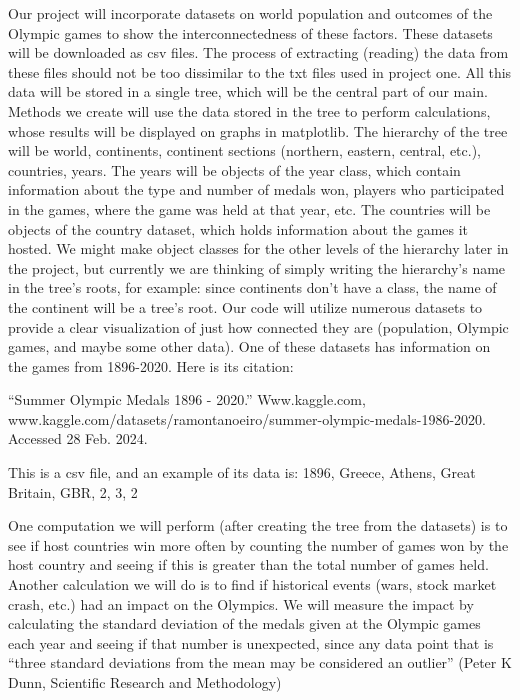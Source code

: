 \documentclass[fontsize=11pt]{article}
\begin{document}
Our project will incorporate datasets on world population and outcomes of the Olympic games to show the interconnectedness of these factors. These datasets will be downloaded as csv files. The process of extracting (reading) the data from these files should not be too dissimilar to the txt files used in project one. All this data will be stored in a single tree, which will be the central part of our main. Methods we create will use the data stored in the tree to perform calculations, whose results will be displayed on graphs in matplotlib. The hierarchy of the tree will be world, continents, continent sections (northern, eastern, central, etc.), countries, years. The years will be objects of the year class, which contain information about the type and number of medals won, players who participated in the games, where the game was held at that year, etc. The countries will be objects of the country dataset, which holds information about the games it hosted. We might make object classes for the other levels of the hierarchy later in the project, but currently we are thinking of simply writing the hierarchy's name in the tree's roots, for example: since continents don't have a class, the name of the continent will be a tree's root. Our code will utilize numerous datasets to provide a clear visualization of just how connected they are (population, Olympic games, and maybe some other data). One of these datasets has information on the games from 1896-2020. Here is its citation: 

  

“Summer Olympic Medals 1896 - 2020.” Www.kaggle.com, www.kaggle.com/datasets/ramontanoeiro/summer-olympic-medals-1986-2020. Accessed 28 Feb. 2024. 

  

This is a csv file, and an example of its data is: 1896, Greece, Athens, Great Britain, GBR, 2, 3, 2 

  

One computation we will perform (after creating the tree from the datasets) is to see if host countries win more often by counting the number of games won by the host country and seeing if this is greater than the total number of games held. Another calculation we will do is to find if historical events (wars, stock market crash, etc.) had an impact on the Olympics. We will measure the impact by calculating the standard deviation of the medals given at the Olympic games each year and seeing if that number is unexpected, since any data point that is “three standard deviations from the mean may be considered an outlier” (Peter K Dunn, Scientific Research and Methodology) 
\end{document}
